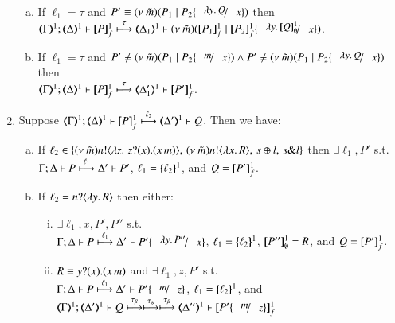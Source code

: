 \begin{proposition}
\begin{enumerate}[1.]
\begin{enumerate}[a)]
				\item
					If $\ell_1 = \tau$
					and $P' \scong \newsp{\tilde{m}}{P_1 \Par P_2 \subst{\abs{y}Q}{x}}$
					then \\
					$\horel{\tmap{\Gamma}{1}}{\tmap{\Delta}{1}}{\pmapp{P}{1}{f}}{\hby{\tau}}
					{\tmap{\Delta_1}{1}}{\newsp{\tilde{m}}{\pmapp{P_1}{1}{f}\Par \pmapp{P_2}{1}{f}\subst{\abs{y}\pmapp{Q}{1}{\emptyset}}{x}}}$.
			
				\item
					If $\ell_1 = \tau$
					and $P' \not\scong \newsp{\tilde{m}}{P_1 \Par P_2 \subst{m}{x}} \land P' \not\scong \newsp{\tilde{m}}{P_1 \Par P_2\subst{\abs{y}Q}{x}}$
					then \\
					$\horel{\tmap{\Gamma}{1}}{\tmap{\Delta}{1}}{\pmapp{P}{1}{f}}{\hby{\tau}}{\tmap{\Delta'_1}{1}}{ \pmapp{P'}{1}{f}}$.
			\end{enumerate}
			
		\item	Suppose $\horel{\tmap{\Gamma}{1}}{\tmap{\Delta}{1}}{\pmapp{P}{1}{f}}{\hby{\ell_2}}{\tmap{\Delta'}{1}}{Q}$.
			Then we have:
%
			\begin{enumerate}[a)]
				\item 
					If $\ell_2 \in
					\{(\nu\ \tilde{m})n ! \langle \lambda z.\,\,z ? (x) . (x\,m) \rangle, \,(\nu\ \tilde{m}) n ! \langle \lambda x.\,R \rangle, \,s \oplus l, \,s \& l\}$
					then $\exists \ell_1, P'$ s.t. \\
					$\Gamma; \Delta \vdash P \stackrel{\ell_1}{\longmapsto} \Delta' \vdash P'$, 
					$\ell_1 = \{\!\!\{\ell_2\}\!\!\}^{1}$, 
					and
					$Q = [\!\![P']\!\!]^{1}_{f}$.
			
				\item 
					If $\ell_2 = n ? \langle \lambda y.\,R \rangle$ %
					then either:
%
					\begin{enumerate}[(i)]
						\item	$\exists \ell_1, x, P', P''$ s.t. \\
							$\horel{\Gamma}{\Delta}{P}{\hby{\ell_1}}{\Delta'}{P' \subst{\abs{y}P''}{x}}$, 
							$\ell_1 = \{\!\!\{\ell_2\}\!\!\}^{1}$, $[\!\![P'']\!\!]^{1}_{\emptyset} = R$, and $Q = [\!\![P']\!\!]^{1}_{f}$.

						\item	$R \equiv y ? (x) . (x\,m)$ and 
							$\exists \ell_1, z, P'$ s.t. \\
							$\horel{\Gamma}{\Delta}{P}{\hby{\ell_1}}{\Delta'}{P' \subst{m}{z}}$, 
							$\ell_1 = \{\!\!\{\ell_2\}\!\!\}^{1}$,
							and\\
							$\horel{\tmap{\Gamma}{1}}{\tmap{\Delta'}{1}}{Q}{\hby{\btau} \hby{\stau} \hby{\btau}}{\tmap{\Delta''}{1}}{\pmapp{P'\subst{m}{z}}{1}{f}}$
					\end{enumerate}
			

\end{enumerate}
\end{enumerate}
\end{proposition}
